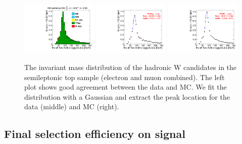 \begin{figure}[htb] 
  {\centering
    \includegraphics[width=0.325\textwidth]{plots/2012_JES/top_overlap_muel.pdf}
    \includegraphics[width=0.325\textwidth]{plots/2012_JES/top_data_fit_muel.pdf}
    \includegraphics[width=0.325\textwidth]{plots/2012_JES/top_mc_fit_muel.pdf}
    \caption{The invariant mass distribution of the hadronic 
      W candidates in the semileptonic top sample (electron and 
      muon combined). 
      The left plot shows good agreement between the data and MC. 
      We fit the distribution with a Gaussian and extract the peak
      location for the data (middle) and MC (right).}
    \label{fig:topw:muel}}
\end{figure}


\subsection{Final selection efficiency on signal}

